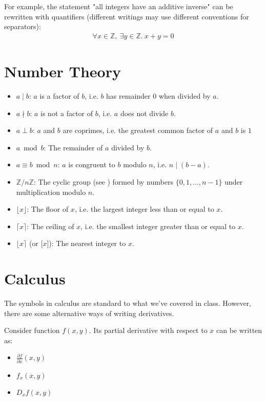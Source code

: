 \documentclass[12pt]{article}
\theoremstyle{definition}
\newcommand{\bras}[1]{\lbrace #1 \rbrace}
\begin{document}
  	For example, the statement "all integers have an additive inverse" can be rewritten with quantifiers (different writings may use different conventions for separators):
  	\begin{gather*}
  		\forall x \in \mathbb{Z},\ \exists y \in \mathbb{Z}.\ x + y = 0
  	\end{gather*}
 	
 	\section{Number Theory}
 	
 	\begin{itemize}
 		\item $a \mid b$: $a$ is a factor of $b$, i.e. $b$ has remainder $0$ when divided by $a$.
 		\item $a \nmid b$: $a$ is not a factor of $b$, i.e. $a$ does not divide $b$.
 		\item $a \perp b$: $a$ and $b$ are coprimes, i.e. the greatest common factor of $a$ and $b$ is $1$
 		\item $a \bmod b$: The remainder of $a$ divided by $b$.
 		\item $a \equiv b \bmod n$: $a$ is congruent to $b$ modulo $n$, i.e. $n \mid (b - a)$.
 		\item $\mathbb{Z}/n\mathbb{Z}$: The cyclic group (see ) formed by numbers $\bras{0, 1, \dots, n - 1}$ under multiplication modulo $n$.
 		\item $\lfloor x \rfloor$: The floor of $x$, i.e. the largest integer less than or equal to $x$.
 		\item $\lceil x \rceil$: The ceiling of $x$, i.e. the smallest integer greater than or equal to $x$.
 		\item $\lfloor x \rceil$ (or $\lbrack x \rbrack$): The nearest integer to $x$.
 	\end{itemize}
 	
 	\section{Calculus}
 	
 	The symbols in calculus are standard to what we've covered in class. However, there are some alternative ways of writing derivatives.
 	
 	Consider function $f(x, y)$. Its partial derivative with respect to $x$ can be written as:
 	\begin{itemize}
 		\item $\frac{\partial f}{\partial x}(x, y)$
 		\item $f_x(x, y)$
 		\item $D_xf(x, y)$
 	\end{itemize}
 	
\end{document}
